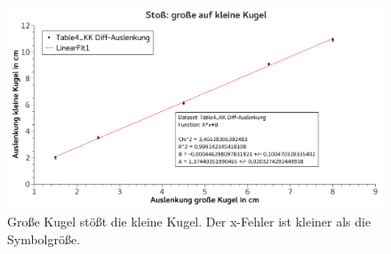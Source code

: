 \documentclass[
	a4paper,
	12pt,
	pagesize,
	ngerman
]{scrartcl}
\begin{document}
	\begin{figure}[htb]
	  \centering
	    \includegraphics[width=1.0\textwidth]{StossGKaufKK}
	  \caption{Große Kugel stößt die kleine Kugel. Der x-Fehler ist kleiner als die Symbolgröße.}
		\label{GraphGKaufKK}
	\end{figure}
\end{document}
